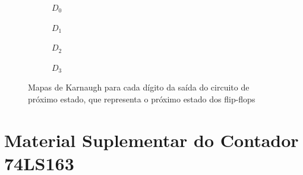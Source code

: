 \documentclass[a4,12pt]{horizon-theme}
\begin{document}
\begin{figure}[!ht]
\centering
\begin{subfigure}[b]{0.49\textwidth}
\centering
{}
\caption{$D_0$}
\label{fig:karnaugh_ff_d0}
\end{subfigure}
\hfill
\begin{subfigure}[b]{0.49\textwidth}
\centering
{}
\caption{$D_1$}
\label{fig:karnaugh_ff_d1}
\end{subfigure}
\hfill\vspace{35pt}
\begin{subfigure}[b]{0.49\textwidth}
\centering
{}
\caption{$D_2$}
\label{fig:karnaugh_ff_d2}
\end{subfigure}
\hfill
\begin{subfigure}[b]{0.49\textwidth}
\centering
{}
\caption{$D_3$}
\label{fig:karnaugh_ff_d3}
\end{subfigure}
\caption{Mapas de Karnaugh para cada dígito da saída do circuito de próximo estado, que representa o próximo estado dos flip-flops}
\label{fig:karnaugh_ff}
\end{figure}

\section{Material Suplementar do Contador 74LS163}
\end{document}
